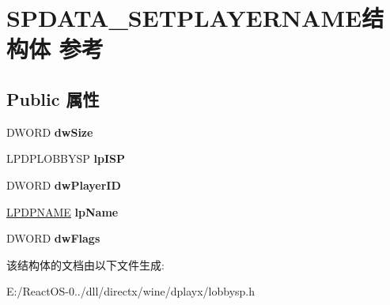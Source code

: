 \hypertarget{struct_s_p_d_a_t_a___s_e_t_p_l_a_y_e_r_n_a_m_e}{}\section{S\+P\+D\+A\+T\+A\+\_\+\+S\+E\+T\+P\+L\+A\+Y\+E\+R\+N\+A\+M\+E结构体 参考}
\label{struct_s_p_d_a_t_a___s_e_t_p_l_a_y_e_r_n_a_m_e}
\subsection*{Public 属性}
\begin{DoxyCompactItemize}
\item 
\mbox{\label{struct_s_p_d_a_t_a___s_e_t_p_l_a_y_e_r_n_a_m_e_af7ab294881f662c46bb1f69635c4fa82}} 
D\+W\+O\+RD {\bfseries dw\+Size}
\item 
\mbox{\label{struct_s_p_d_a_t_a___s_e_t_p_l_a_y_e_r_n_a_m_e_a5a0cf69e70cb90ab603e654fb5e3f22a}} 
L\+P\+D\+P\+L\+O\+B\+B\+Y\+SP {\bfseries lp\+I\+SP}
\item 
\mbox{\label{struct_s_p_d_a_t_a___s_e_t_p_l_a_y_e_r_n_a_m_e_a104815869de7cd85d08b8cc86af4a9a3}} 
D\+W\+O\+RD {\bfseries dw\+Player\+ID}
\item 
\mbox{\label{struct_s_p_d_a_t_a___s_e_t_p_l_a_y_e_r_n_a_m_e_add9f1bce8e0da680a068e616c90842c8}} 
\hyperlink{structtag_d_p_n_a_m_e}{L\+P\+D\+P\+N\+A\+ME} {\bfseries lp\+Name}
\item 
\mbox{\label{struct_s_p_d_a_t_a___s_e_t_p_l_a_y_e_r_n_a_m_e_a37e962294351b7cfbe29d685bc01e589}} 
D\+W\+O\+RD {\bfseries dw\+Flags}
\end{DoxyCompactItemize}


该结构体的文档由以下文件生成\+:\begin{DoxyCompactItemize}
\item 
E\+:/\+React\+O\+S-\/0../dll/directx/wine/dplayx/lobbysp.\+h\end{DoxyCompactItemize}
